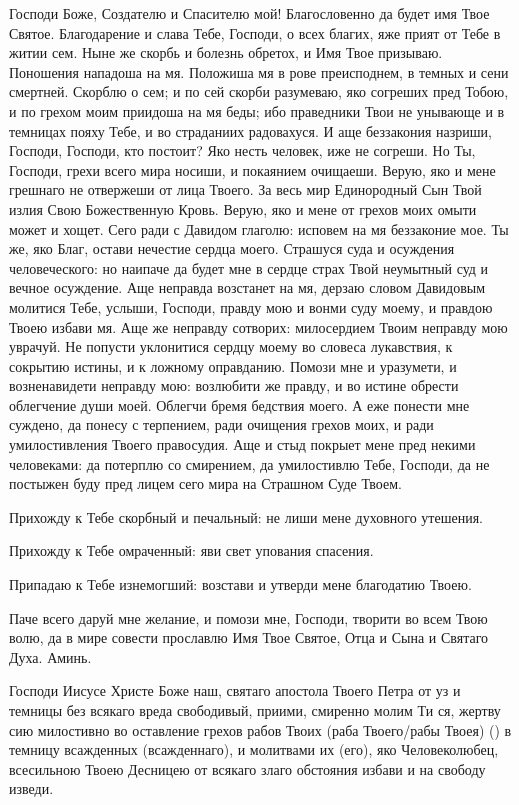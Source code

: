 \begin{mymulticols}

Господи Боже, Создателю и Спасителю мой! Благословенно да будет имя Твое Святое. Благодарение и слава Тебе, Господи, о всех благих, яже прият от Тебе в житии сем. Ныне же скорбь и болезнь обретох, и Имя Твое призываю. Поношения нападоша на мя. Положиша мя в рове преисподнем, в темных и сени смертней. Скорблю о сем; и по сей скорби разумеваю, яко согреших пред Тобою, и по грехом моим приидоша на мя беды;  ибо праведники Твои не унывающе и в темницах пояху Тебе, и во страданиих радовахуся. И аще беззакония назриши, Господи, Господи, кто постоит?  Яко несть человек, иже не согреши. Но Ты, Господи, грехи всего мира носиши, и покаянием очищаеши. Верую, яко и мене грешнаго не отвержеши от лица Твоего. За весь мир Единородный Сын Твой излия Свою Божественную Кровь. Верую, яко и мене от грехов моих омыти может и хощет. Сего ради с Давидом глаголю: исповем на мя беззаконие мое. Ты же, яко Благ, остави нечестие сердца моего. Страшуся суда и осуждения человеческого: но наипаче да будет мне в сердце страх Твой неумытный суд и вечное осуждение. Аще неправда возстанет на мя, дерзаю словом Давидовым молитися Тебе, услыши, Господи, правду мою и вонми суду моему, и правдою Твоею избави мя. Аще же неправду сотворих: милосердием Твоим неправду мою уврачуй. Не попусти уклонитися сердцу моему во словеса лукавствия, к сокрытию истины, и к ложному оправданию. Помози мне и уразумети, и возненавидети неправду мою: возлюбити же правду, и во истине обрести облегчение души моей. Облегчи бремя бедствия моего. А еже понести мне суждено, да понесу с терпением, ради очищения грехов моих, и ради умилостивления Твоего правосудия. Аще и стыд покрыет мене пред некими человеками: да потерплю со смирением, да умилостивлю Тебе, Господи, да не постыжен буду пред лицем сего мира на Страшном Суде Твоем.

Прихожду к Тебе скорбный и печальный: не лиши мене духовного утешения. 

Прихожду к Тебе омраченный: яви свет упования спасения. 

Припадаю к Тебе изнемогший: возстави и утверди мене благодатию Твоею. 

Паче всего даруй мне желание, и помози мне, Господи, творити во всем Твою волю, да в мире совести прославлю Имя Твое Святое, Отца и Сына и Святаго Духа. Аминь.

\end{mymulticols}

\mychapterending

\begin{mymulticols}
 

Господи Иисусе Христе Боже наш, святаго апостола Твоего Петра от уз и темницы без всякаго вреда свободивый, приими, смиренно молим Ти ся, жертву сию милостивно во оставление грехов рабов Твоих (раба Твоего/рабы Твоея)  () в темницу всажденных  (всажденнаго), и молитвами их (его), яко Человеколюбец, всесильною Твоею Десницею от всякаго злаго обстояния избави и на свободу изведи.

\end{mymulticols}

\mychapterending

